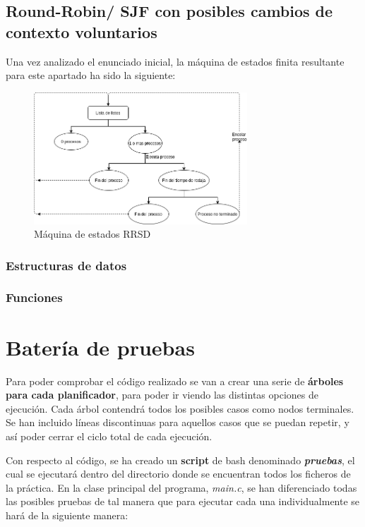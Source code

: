 \documentclass[10pt, spanish, pdftex]{template/UC3M_document}
\begin{document}
\subsection{Round-Robin/ SJF con posibles cambios de contexto voluntarios}
Una vez analizado el enunciado inicial, la máquina de estados finita resultante para este apartado ha sido la siguiente:

\newpage
\vspace{0.5cm}
\begin{figure}[!h]
    \centering
    \includegraphics[width=8cm]{arboles/RoundRobin.png}
    \caption{Máquina de estados RRSD}
\end{figure}
\subsubsection{Estructuras de datos}
\subsubsection{Funciones}

\newpage
\section{Batería de pruebas}
Para poder comprobar el código realizado se van a crear una serie de \textbf{árboles para cada planificador}, para poder ir viendo las distintas opciones de ejecución. Cada árbol contendrá todos los posibles casos como nodos terminales. Se han incluido líneas discontinuas para aquellos casos que se puedan repetir, y así poder cerrar el ciclo total de cada ejecución.

Con respecto al código, se ha creado un \textbf{script} de bash denominado \textbf{\textit{pruebas}}, el cual se ejecutará dentro del directorio donde se encuentran todos los ficheros de la práctica. En la clase principal del programa, \textit{main.c}, se han diferenciado todas las posibles pruebas de tal manera que para ejecutar cada una individualmente se hará de la siguiente manera:
       
\end{document}
